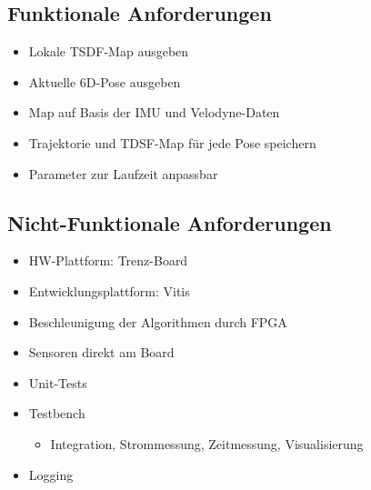 \documentclass{beamer}
\newcommand{\setfont}[2]{{\fontfamily{#1}\selectfont #2}}
\begin{document}
\subsection{Funktionale Anforderungen}
\begin{frame}{\subsecname}
\begin{itemize}
\item{Lokale TSDF-Map ausgeben}
\item{Aktuelle 6D-Pose ausgeben}
\item{Map auf Basis der IMU und Velodyne-Daten}
\item{Trajektorie und TDSF-Map für jede Pose speichern}
\item{Parameter zur Laufzeit anpassbar}
\end{itemize}
\begin{center}
\end{center}
\end{frame}

\subsection{Nicht-Funktionale Anforderungen}
\begin{frame}{\subsecname}
\begin{itemize}
\item{HW-Plattform: Trenz-Board}
\item{Entwicklungsplattform: Vitis}
\item{Beschleunigung der Algorithmen durch FPGA}
\item{Sensoren direkt am Board}
\item{Unit-Tests}
\item{Testbench}
\begin{itemize}
\item{Integration, Strommessung, Zeitmessung, Visualisierung}
\end{itemize}
\item{Logging}
\end{itemize}
\end{frame}
\end{document}
